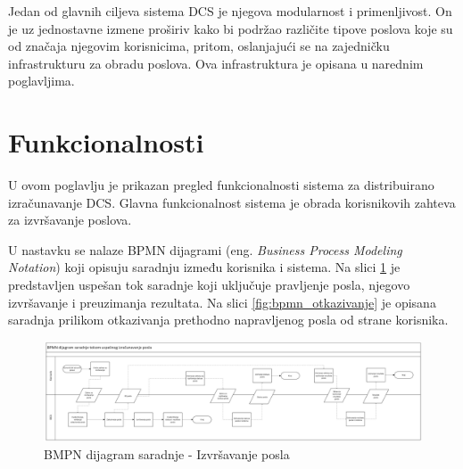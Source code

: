 \documentclass[12pt,oneside]{memoir}
\begin{document}

Jedan od glavnih ciljeva sistema DCS je njegova modularnost i primenljivost. On je uz jednostavne izmene proširiv kako bi podržao različite tipove poslova koje su od značaja njegovim korisnicima, pritom, oslanjajući se na zajedničku infrastrukturu za obradu poslova. Ova infrastruktura je opisana u narednim poglavljima.


\section{Funkcionalnosti}
\label{chp:opisfunkc}


U ovom poglavlju je prikazan pregled funkcionalnosti sistema za distribuirano izračunavanje DCS. 
Glavna funkcionalnost sistema je obrada korisnikovih zahteva za izvršavanje poslova. 

U nastavku se nalaze BPMN dijagrami (eng. \emph{Business Process Modeling Notation}) koji opisuju saradnju između korisnika i sistema. Na slici \ref{fig:bpmn_korisnik} je predstavljen uspešan tok saradnje koji uključuje pravljenje posla, njegovo izvršavanje i preuzimanja rezultata. Na slici \ref{fig:bpmn_otkazivanje} je opisana saradnja prilikom otkazivanja prethodno napravljenog posla od strane korisnika.

\begin{figure}[!ht]
  \centering
  \includegraphics[width=1\textwidth]{./images/BPMN_dijagram_saradnje_korisnik_dsc.png}
  \caption{BMPN dijagram saradnje - Izvršavanje posla}
  \label{fig:bpmn_korisnik}
\end{figure}
\end{document}
